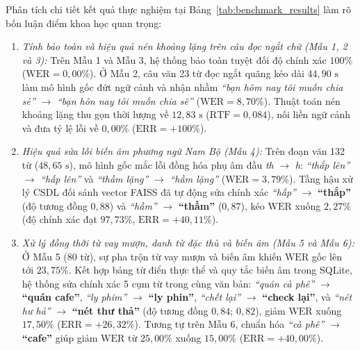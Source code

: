 \documentclass[12pt,a4paper]{article}
\begin{document}
Phân tích chi tiết kết quả thực nghiệm tại Bảng~\ref{tab:benchmark_results} làm rõ bốn luận điểm khoa học quan trọng:
\begin{enumerate}
  \item \textit{Tính bảo toàn và hiệu quả nén khoảng lặng trên câu đọc ngắt chữ (Mẫu 1, 2 và 3):} Trên Mẫu 1 và Mẫu 3, hệ thống bảo toàn tuyệt đối độ chính xác $100\%$ ($\mathrm{WER} = 0{,}00\%$). Ở Mẫu 2, câu văn 23 từ đọc ngắt quãng kéo dài $44{,}90\text{ s}$ làm mô hình gốc đứt ngữ cảnh và nhận nhầm \textit{``bạn hôm nay tôi muốn chia sẻ''} $\to$ \textit{``bạn hôn nay tôi muốn chia sẽ''} ($\mathrm{WER} = 8{,}70\%$). Thuật toán nén khoảng lặng thu gọn thời lượng về $12{,}83\text{ s}$ ($\mathrm{RTF} = 0{,}084$), nối liền ngữ cảnh và đưa tỷ lệ lỗi về \textbf{$0{,}00\%$} ($\mathrm{ERR} = +100\%$).
  \item \textit{Hiệu quả sửa lỗi biến âm phương ngữ Nam Bộ (Mẫu 4):} Trên đoạn văn 132 từ ($48{,}65\text{ s}$), mô hình gốc mắc lỗi đồng hóa phụ âm đầu \textit{th} $\to$ \textit{h}: \textit{``thắp lên''} $\to$ \textit{``hấp lên''} và \textit{``thầm lặng''} $\to$ \textit{``hầm lặng''} ($\mathrm{WER} = 3{,}79\%$). Tầng hậu xử lý CSDL đối sánh vector FAISS đã tự động sửa chính xác \textit{``hấp''} $\to$ \textbf{``thắp''} (độ tương đồng $0{,}88$) và \textit{``hầm''} $\to$ \textbf{``thầm''} ($0{,}87$), kéo $\mathrm{WER}$ xuống \textbf{$2{,}27\%$} (độ chính xác đạt $97{,}73\%$, $\mathrm{ERR} = +40{,}11\%$).
  \item \textit{Xử lý đồng thời từ vay mượn, danh từ đặc thù và biến âm (Mẫu 5 và Mẫu 6):} Ở Mẫu 5 (80 từ), sự pha trộn từ vay mượn và biến âm khiến $\mathrm{WER}$ gốc lên tới $23{,}75\%$. Kết hợp bảng từ điển thực thể và quy tắc biến âm trong SQLite, hệ thống sửa chính xác 5 cụm từ trong cùng văn bản: \textit{``quán cà phê''} $\to$ \textbf{``quán cafe''}, \textit{``ly phim''} $\to$ \textbf{``ly phin''}, \textit{``chết lại''} $\to$ \textbf{``check lại''}, và \textit{``nét hư hả''} $\to$ \textbf{``nét thư thả''} (độ tương đồng $0{,}84;\, 0{,}82$), giảm $\mathrm{WER}$ xuống \textbf{$17{,}50\%$} ($\mathrm{ERR} = +26{,}32\%$). Tương tự trên Mẫu 6, chuẩn hóa \textit{``cà phê''} $\to$ \textbf{``cafe''} giúp giảm $\mathrm{WER}$ từ $25{,}00\%$ xuống \textbf{$15{,}00\%$} ($\mathrm{ERR} = +40{,}00\%$).

\end{enumerate}
\end{document}
